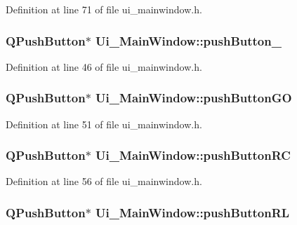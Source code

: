 Definition at line 71 of file ui\-\_\-mainwindow.\-h.

\hypertarget{class_ui___main_window_a59a7d8124bce933d63f53f2153d447b4}{
\subsubsection[{push\-Button\-\_\-2}]{\setlength{\rightskip}{0pt plus 5cm}Q\-Push\-Button$\ast$ Ui\-\_\-\-Main\-Window\-::push\-Button\-\_}}\label{class_ui___main_window_a59a7d8124bce933d63f53f2153d447b4}


Definition at line 46 of file ui\-\_\-mainwindow.\-h.

\hypertarget{class_ui___main_window_a5e73aa9808d96aef650ab0eaaba4757f}{
\subsubsection[{push\-Button\-G\-O}]{\setlength{\rightskip}{0pt plus 5cm}Q\-Push\-Button$\ast$ Ui\-\_\-\-Main\-Window\-::push\-Button\-G\-O}}\label{class_ui___main_window_a5e73aa9808d96aef650ab0eaaba4757f}


Definition at line 51 of file ui\-\_\-mainwindow.\-h.

\hypertarget{class_ui___main_window_a6d475960f07a30a544a97210558c25ce}{
\subsubsection[{push\-Button\-R\-C}]{\setlength{\rightskip}{0pt plus 5cm}Q\-Push\-Button$\ast$ Ui\-\_\-\-Main\-Window\-::push\-Button\-R\-C}}\label{class_ui___main_window_a6d475960f07a30a544a97210558c25ce}


Definition at line 56 of file ui\-\_\-mainwindow.\-h.

\hypertarget{class_ui___main_window_a95f52bfebed7af8f26c3278c21e3849c}{
\subsubsection[{push\-Button\-R\-L}]{\setlength{\rightskip}{0pt plus 5cm}Q\-Push\-Button$\ast$ Ui\-\_\-\-Main\-Window\-::push\-Button\-R\-L}}\label{class_ui___main_window_a95f52bfebed7af8f26c3278c21e3849c}


